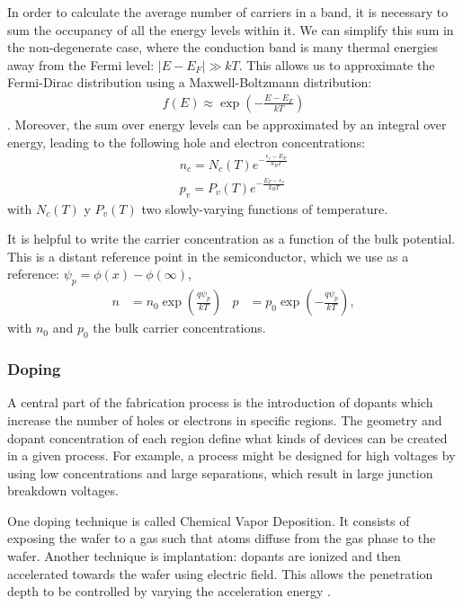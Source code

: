 In order to calculate the average number of carriers in a band,
it is necessary to sum the occupancy of all the energy levels within it.
We can simplify this sum in the non-degenerate case, where
the conduction band is many thermal energies away from the Fermi level:
$|E-E_F| \gg kT$.
This allows us to approximate the Fermi-Dirac distribution using a
Maxwell-Boltzmann distribution:
\begin{align*}
    f(E) \approx \exp\left(-\frac{E-E_F}{kT}\right)
\end{align*}.
Moreover, the sum over energy levels can be approximated by an integral
over energy, leading to the following hole and electron concentrations:
\begin{align*}
    n_c = N_c(T)e^{-\frac{\epsilon_c-E_F}{k_BT}}\\
    p_v = P_v(T)e^{-\frac{E_F-\epsilon_v}{k_BT}}
\end{align*} with $N_c(T)$ y $P_v(T)$ two slowly-varying functions of temperature.

It is helpful to write the carrier concentration as a function of the bulk potential.
This is a distant reference point in the semiconductor, which we use as a reference:
$\psi_p=\phi(x)-\phi(\infty)$,
\begin{align}
    n &= n_0\exp\left(\frac{q\psi_p}{kT}\right)&
    p &= p_0\exp\left(-\frac{q\psi_p}{kT}\right),
    \label{eq:portadores_nodegenerados}
\end{align}
with $n_0$ and $p_0$ the bulk carrier concentrations.
\subsubsection{Doping}
A central part of the fabrication process is the introduction of dopants
which increase the number of holes or electrons in specific regions.
The geometry and dopant concentration of each region define what kinds of devices
can be created in a given process.
For example, a process might be designed for high voltages by using low concentrations
and large separations, which result in large junction breakdown voltages.

One doping technique is called Chemical Vapor Deposition.
It consists of exposing the wafer to a gas such that atoms diffuse from
the gas phase to the wafer.
Another technique is implantation: dopants are ionized and then accelerated
towards the wafer using electric field.
This allows the penetration depth to be controlled by varying the
acceleration energy
\cite{campbell_science_2001}.


